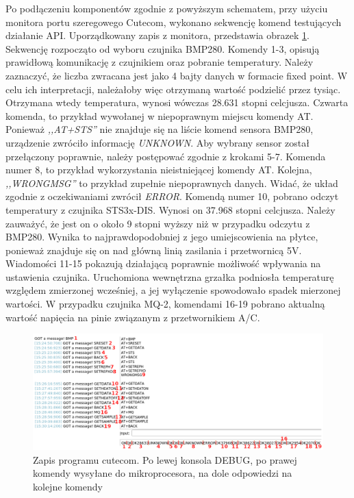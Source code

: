 Po podłączeniu komponentów zgodnie z powyższym schematem, przy użyciu monitora portu szeregowego Cutecom, wykonano sekwencję komend testujących działanie API. Uporządkowany zapis z monitora, przedstawia obrazek \ref{img:cutecom}. Sekwencję rozpocząto od wyboru czujnika BMP280. Komendy 1-3, opisują prawidłową komunikację z czujnikiem oraz pobranie temperatury. Należy zaznaczyć, że liczba zwracana jest jako 4 bajty danych w formacie fixed point. W celu ich interpretacji, należałoby więc otrzymaną wartość podzielić przez tysiąc. Otrzymana wtedy temperatura, wynosi wówczas 28.631 stopni celcjusza. Czwarta komenda, to przykład wywołanej w niepoprawnym miejscu komendy AT. Ponieważ \textit{,,AT+STS''} nie znajduje się na liście komend sensora BMP280, urządzenie zwróciło informację \textit{UNKNOWN}. Aby wybrany sensor został przełączony poprawnie, należy postępować zgodnie z krokami 5-7. Komenda numer 8, to przykład wykorzystania nieistniejącej komendy AT. Kolejna, \textit{,,WRONGMSG''} to przykład zupełnie niepoprawnych danych. Widać, że układ zgodnie z oczekiwaniami zwrócił \textit{ERROR}. Komendą numer 10, pobrano odczyt temperatury z czujnika STS3x-DIS. Wynosi on 37.968 stopni celcjusza. Należy zauważyć, że jest on o około 9 stopni wyższy niż w przypadku odczytu z BMP280. Wynika to  najprawdopodobniej z jego umiejscowienia na płytce, ponieważ znajduje się on nad główną linią zasilania i przetwornicą 5V. Wiadomości 11-15 pokazują działającą poprawnie możliwość wpływania na ustawienia czujnika. Uruchomiona wewnętrzna grzałka podniosła temperaturę względem zmierzonej wcześniej, a jej wyłączenie spowodowało spadek mierzonej wartości. W przypadku czujnika MQ-2, komendami 16-19 pobrano aktualną wartość napięcia na pinie związanym z przetwornikiem A/C.

\begin{figure}[H]
    \centering
    \includegraphics[width=\textwidth, height=\textheight, keepaspectratio]{Graphics/logs.png}
    \caption{Zapis programu cutecom. Po lewej konsola DEBUG, po prawej komendy wysyłane do mikroprocesora, na dole odpowiedzi na kolejne komendy}
    \label{img:cutecom}
\end{figure}

